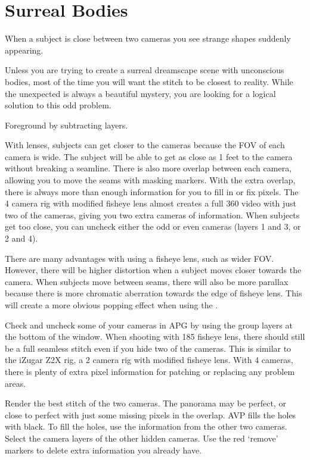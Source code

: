 \section{Surreal Bodies}
\pagecolor{white}
\label{chap:39}
\begin{fullwidth}

\problem

{\large When a subject is close between two cameras you see strange shapes suddenly appearing. \par}

Unless you are trying to create a surreal dreamscape scene with unconscious bodies, most of the time you will want the stitch to be closest to reality. While the unexpected is always a beautiful mystery, you are looking for a logical solution to this odd problem.

\clearpage
\solutions

{\large Foreground by subtracting layers. \par}

With \textbf{} lenses, subjects can get closer to the cameras because the FOV of each camera is wide. The subject will be able to get as close as 1 feet to the camera without breaking a seamline. There is also more overlap between each camera, allowing you to move the seams with masking markers. With the extra overlap, there is always more than enough information for you to fill in or fix pixels. The 4 camera rig with modified fisheye lens almost creates a full 360 video with just two of the cameras, giving you two extra cameras of information. When subjects get too close, you can uncheck either the odd or even cameras (layers 1 and 3, or 2 and 4). 


There are many advantages with using a fisheye lens, such as wider FOV. However, there will be higher distortion when a subject moves closer towards the camera. When subjects move between seams, there will also be more parallax because there is more chromatic aberration towards the edge of fisheye lens. This will create a more obvious popping effect when using the \textbf{}.


Check and uncheck some of your cameras in APG by using the group layers at the bottom of the window. When shooting with 185 fisheye lens, there should still be a full seamless stitch even if you hide two of the cameras.  This is similar to the iZugar Z2X rig, a 2 camera rig with modified fisheye lens. With 4 cameras, there is plenty of extra pixel information for patching or replacing any problem areas. 


Render the best stitch of the two cameras. The panorama may be perfect, or close to perfect with just some missing pixels in the overlap. AVP fills the holes with black. To fill the holes, use the information from the other two cameras. Select the camera layers of the other hidden cameras. Use the red ‘remove’ markers to delete extra information you already have.


\clearpage
\end{fullwidth}